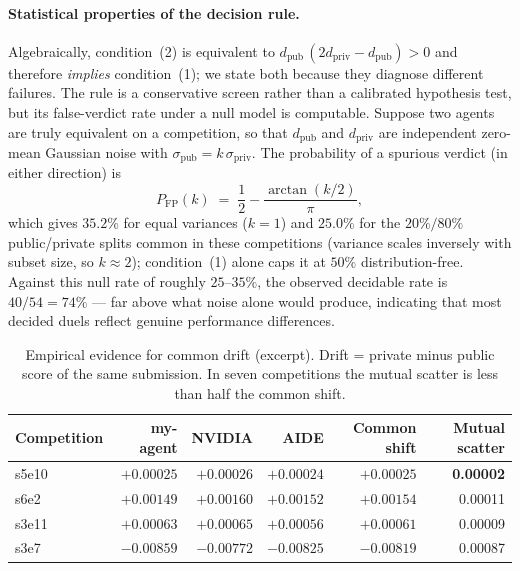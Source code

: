 \documentclass[11pt,a4paper]{article}
\begin{document}
\paragraph{Statistical properties of the decision rule.} Algebraically, condition~(2) is equivalent to $d_{\mathrm{pub}}\,(2d_{\mathrm{priv}} - d_{\mathrm{pub}}) > 0$ and therefore \emph{implies} condition~(1); we state both because they diagnose different failures. The rule is a conservative screen rather than a calibrated hypothesis test, but its false-verdict rate under a null model is computable. Suppose two agents are truly equivalent on a competition, so that $d_{\mathrm{pub}}$ and $d_{\mathrm{priv}}$ are independent zero-mean Gaussian noise with $\sigma_{\mathrm{pub}} = k\,\sigma_{\mathrm{priv}}$. The probability of a spurious verdict (in either direction) is
\begin{equation}
P_{\mathrm{FP}}(k) \;=\; \frac{1}{2} - \frac{\arctan(k/2)}{\pi},
\end{equation}
which gives $35.2\%$ for equal variances ($k=1$) and $25.0\%$ for the $20\%/80\%$ public/private splits common in these competitions (variance scales inversely with subset size, so $k \approx 2$); condition~(1) alone caps it at $50\%$ distribution-free. Against this null rate of roughly $25$--$35\%$, the observed decidable rate is $40/54 = 74\%$ --- far above what noise alone would produce, indicating that most decided duels reflect genuine performance differences.

\begin{table}[htbp]
\centering\small
\caption{Empirical evidence for common drift (excerpt). Drift = private minus public score of the same submission. In seven competitions the mutual scatter is less than half the common shift.}
\label{tab:drift}
\begin{tabular}{@{}lrrrrr@{}}
\toprule
\textbf{Competition} & \textbf{my-agent} & \textbf{NVIDIA} & \textbf{AIDE} & \textbf{Common shift} & \textbf{Mutual scatter} \\
\midrule
s5e10 & $+0.00025$ & $+0.00026$ & $+0.00024$ & $+0.00025$ & \textbf{0.00002} \\
s6e2  & $+0.00149$ & $+0.00160$ & $+0.00152$ & $+0.00154$ & 0.00011 \\
s3e11 & $+0.00063$ & $+0.00065$ & $+0.00056$ & $+0.00061$ & 0.00009 \\
s3e7  & $-0.00859$ & $-0.00772$ & $-0.00825$ & $-0.00819$ & 0.00087 \\
\bottomrule
\end{tabular}
\end{table}
\end{document}
